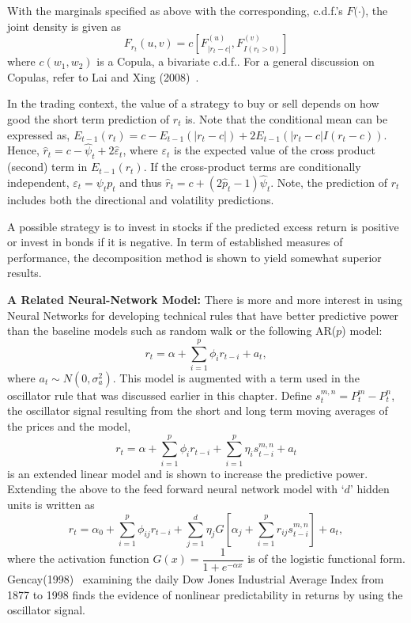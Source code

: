 With the marginals specified as above with the corresponding, c.d.f.'s $F(\cdot$), the joint density is given as
	\begin{equation}\label{eqn:frt}
	F_{r_t}(u,v) = c \left[ F_{\lvert r_t-c\rvert}^{(u)}, F_{I(r_t>0)}^{(v)} \right]
	\end{equation}
where $c(w_1, w_2)$ is a Copula, a bivariate c.d.f.. For a general discussion on Copulas, refer to Lai and Xing (2008)~\cite[Section 12.3.3]{lai1}.


In the trading context, the value of a strategy to buy or sell depends on how good the short term prediction of $r_{t}$ is. Note that the conditional mean can be expressed as, $E_{t-1}(r_t) = c - E_{t-1}(\left| r_t - c \right|) + 2 E_{t-1}(\left| r_t - c \right| I(r_t - c))$. Hence, $\hat{r}_{t} = c - \hat{\psi}_{t} + 2 \hat{\varepsilon}_t$, where $\varepsilon_t$ is the expected value of the cross product (second) term in $E_{t-1}(r_t)$. If the cross-product terms are conditionally independent, $\varepsilon_t = \psi_t p_t$ and thus $\hat{r}_t = c + (2\hat{p}_t - 1)\hat{\psi}_t$. Note, the prediction of $r_{t}$ includes both the directional and volatility predictions.


A possible strategy is to invest in stocks if the predicted excess return is positive or invest in bonds if it is negative. In term of established measures of performance, the decomposition method is shown to yield somewhat superior results. \twomedskip


\noindent\textbf{A Related Neural-Network Model:} There is more and more interest in using Neural Networks for developing technical rules that have better predictive power than the baseline models such as random walk or the following AR($p$) model:
	\begin{equation} \label{eqn:ri}
	r_t = \alpha + \sum_{i=1}^p\phi_ir_{t-i} + a_t,
	\end{equation}
where $a_t \sim N(0, \sigma_a^2)$. This model is augmented with a term used in the oscillator rule that was discussed earlier in this chapter. Define $s_t^{m,n} = P_t^m - P_t^n$, the oscillator signal resulting from the short and long term moving averages of the prices and the model,
	\begin{equation} \label{eqn:rtsum}
	r_t = \alpha + \sum_{i=1}^p\phi_ir_{t-i} + \sum_{i=1}^p\eta_is_{t-i}^{m,n}+ a_t
	\end{equation}
is an extended linear model and is shown to increase the predictive power. Extending the above to the feed forward neural network model with `$d$' hidden units is written as
	\begin{equation} \label{eqn:rtsum2}
	r_t = \alpha_0 + \sum_{i=1}^p \phi_{ij}r_{t-i} + \sum_{j=1}^d \eta_j G\left[\alpha_j + \sum_{i=1}^pr_{ij}s_{t-i}^{m,n} \right] + a_t,
	\end{equation}
where the activation function $G(x) = \dfrac{1}{1 + e^{-\alpha x}}$ is of the logistic functional form. Gencay(1998)~\cite{gencay} examining the daily Dow Jones Industrial Average Index from 1877 to 1998 finds the evidence of nonlinear predictability in returns by using the oscillator signal. \label{in:decomp2}



